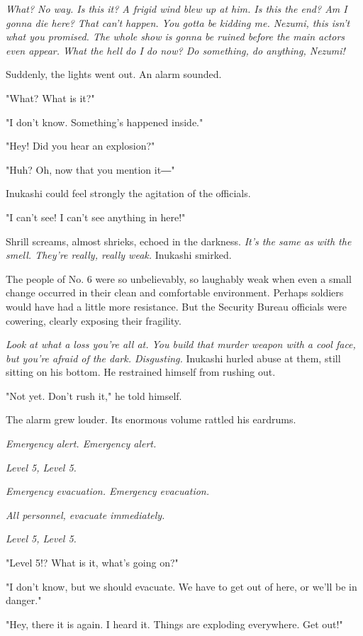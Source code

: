 \emph{What? No way. Is this it? A frigid wind blew up at him. Is this the end?
Am I gonna die here? That can't happen. You gotta be kidding me. Nezumi,
this isn't what you promised. The whole show is gonna be ruined before
the main actors even appear. What the hell do I do now? Do something, do
anything, Nezumi!}

Suddenly, the lights went out. An alarm sounded.

"What? What is it?"

"I don't know. Something's happened inside."

"Hey! Did you hear an explosion?"

"Huh? Oh, now that you mention it―"

Inukashi could feel strongly the agitation of the officials.

"I can't see! I can't see anything in here!"

Shrill screams, almost shrieks, echoed in the darkness. \emph{It's the same as
with the smell. They're really, really weak.} Inukashi smirked.

The people of No. 6 were so unbelievably, so laughably weak when even a
small change occurred in their clean and comfortable environment.
Perhaps soldiers would have had a little more resistance. But the
Security Bureau officials were cowering, clearly exposing their
fragility.

\emph{Look at what a loss you're all at. You build that murder weapon with a
cool face, but you're afraid of the dark. Disgusting.} Inukashi hurled
abuse at them, still sitting on his bottom. He restrained himself from
rushing out.

"Not yet. Don't rush it," he told himself.

The alarm grew louder. Its enormous volume rattled his eardrums.

\emph{Emergency alert. Emergency alert.}

\emph{Level 5, Level 5.}

\emph{Emergency evacuation. Emergency evacuation.}

\emph{All personnel, evacuate immediately.}

\emph{Level 5, Level 5.}

"Level 5!? What is it, what's going on?"

"I don't know, but we should evacuate. We have to get out of here, or
we'll be in danger."

"Hey, there it is again. I heard it. Things are exploding everywhere.
Get out!"

